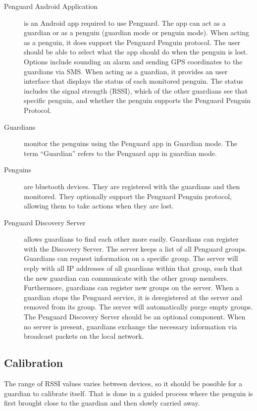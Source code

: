 \documentclass{report}
\begin{document}
\begin{description}
    \item [Penguard Android Application] is an Android app required to use Penguard. The app can act as a guardian or as a penguin (guardian mode or penguin mode). When acting as a penguin, it does support the Penguard Penguin protocol. The user should be able to select what the app should do when the penguin is lost. Options include sounding an alarm and sending GPS coordinates to the guardians via SMS. When acting as a guardian, it provides an user interface that displays the status of each monitored penguin. The status includes the signal strength (RSSI), which of the other guardians see that specific penguin, and whether the penguin supports the Penguard Penguin Protocol.
    \item [Guardians] monitor the penguins using the Penguard app in Guardian mode. The term ``Guardian'' refers to the Penguard app in guardian mode.
    \item [Penguins] are bluetooth devices. They are registered with the guardians and then monitored. They optionally support the Penguard Penguin protocol, allowing them to take actions when they are lost.
    \item [Penguard Discovery Server] allows guardians to find each other more easily. Guardians can register with the Discovery Server. The server keeps a list of all Penguard groups. Guardians can request information on a specific group. The server will reply with all IP addresses of all guardians within that group, such that the new guardian can communicate with the other group members. Furthermore, guardians can register new groups on the server. When a guardian stops the Penguard service, it is deregistered at the server and removed from its group. The server will automatically purge empty groups. The Penguard Discovery Server should be an optional component. When no server is present, guardians exchange the necessary information via broadcast packets on the local network.
\end{description}

\subsection{Calibration}

The range of RSSI values varies between devices, so it should be possible for a guardian to calibrate itself. That is done in a guided process where the penguin is first brought close to the guardian and then slowly carried away.
\end{document}
